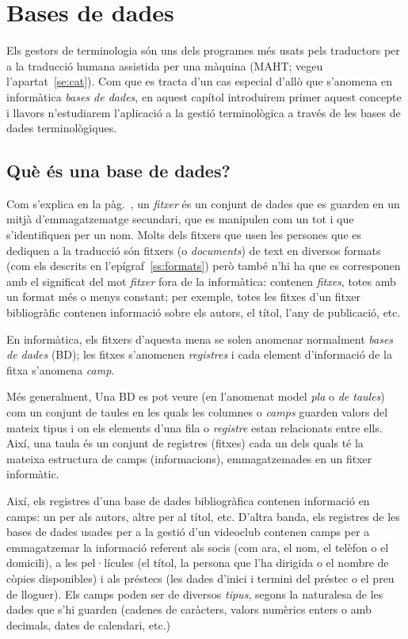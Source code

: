\chapter{Bases de dades}
\label{se:basesdades}

Els gestors de terminologia són uns dels programes més usats pels
traductors per a la traducció humana assistida per una màquina (MAHT;
vegeu l'apartat~\ref{se:cat}). Com que es tracta d'un cas especial
d'allò que s'anomena en informàtica \emph{bases de dades}, en aquest
capítol introduirem primer aquest concepte i llavors n'estudiarem
l'aplicació a la gestió terminològica a través de les bases de dades
terminològiques.


\section{Què és una base de dades?} 

Com s'explica en la pàg.~\pageref{pg:fitxer}, un \emph{fitxer} és un
conjunt de dades que es guarden en un mitjà d'emmagatzematge
secundari, que es manipulen com un tot i que s'identifiquen per un
nom. Molts dels fitxers que usen les persones que es dediquen a la
traducció són fitxers (o \emph{documents}) de text en diversos formats
(com els descrits en l'epígraf~\ref{ss:formats}) però també n'hi ha
que es corresponen amb el significat del mot \emph{fitxer} fora de la
informàtica: contenen \emph{fitxes}, totes amb un format més o menys
constant; per exemple, totes les fitxes d'un fitxer bibliogràfic
contenen informació sobre els autors, el títol, l'any de publicació,
etc.

En informàtica, els fitxers d'aquesta mena se solen anomenar
normalment \emph{bases de dades} (BD); les fitxes s'anomenen
\emph{registres} i cada element d'informació de la fitxa s'anomena
\emph{camp}.

Més generalment, Una BD es pot veure (en l'anomenat model \emph{pla} o
\emph{de taules}) com un conjunt de taules en les quals les columnes o
\emph{camps} guarden valors del mateix tipus i on els elements d'una
fila o \emph{registre} estan relacionats entre ells. Així, una taula
és un conjunt de registres (fitxes) cada un dels quals té la mateixa
estructura de camps (informacions), emmagatzemades en un fitxer
informàtic.

Així, els registres d'una base de dades bibliogràfica contenen
informació en camps: un per als autors, altre per al títol,
etc. D'altra banda, els registres de les bases de dades usades per a
la gestió d'un videoclub contenen camps per a emmagatzemar la
informació referent als socis (com ara, el nom, el telèfon o el
domicili), a les pel·lícules (el títol, la persona que l'ha dirigida o
el nombre de còpies disponibles) i als préstecs (les dades d'inici i
termini del préstec o el preu de lloguer). Els camps poden ser de
diversos \emph{tipus}, segons la naturalesa de les dades que s'hi
guarden (cadenes de caràcters, valors numèrics enters o amb decimals,
dates de calendari, etc.)

